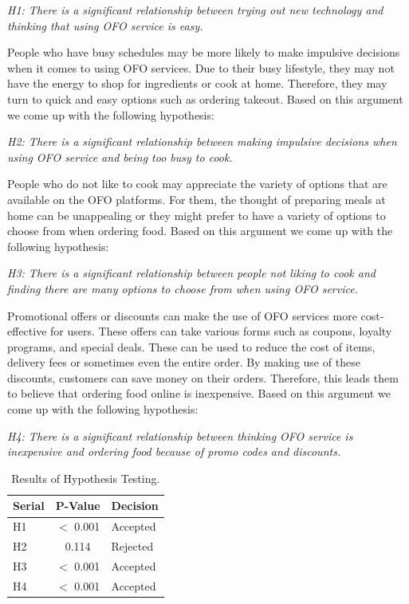 \documentclass[a4paper,fleqn]{cas-sc}
\begin{document}
\textit{H1: There is a significant relationship between trying out new technology and thinking that using OFO service is easy.} 

People who have busy schedules may be more likely to make impulsive decisions when it comes to using OFO services. Due to their busy lifestyle, they may not have the energy to shop for ingredients or cook at home. Therefore, they may turn to quick and easy options such as ordering takeout. Based on this argument we come up with the following hypothesis: 

\textit{H2: There is a significant relationship between making impulsive decisions when using OFO service and being too busy to cook.} 

People who do not like to cook may appreciate the variety of options that are available on the OFO platforms. For them, the thought of preparing meals at home can be unappealing or they might prefer to have a variety of options to choose from when ordering food. Based on this argument we come up with the following hypothesis: 

\textit{H3: There is a significant relationship between people not liking to cook and finding there are many options to choose from when using OFO service.} 

Promotional offers or discounts can make the use of OFO services more cost-effective for users. These offers can take various forms such as coupons, loyalty programs, and special deals. These can be used to reduce the cost of items, delivery fees or sometimes even the entire order. By making use of these discounts, customers can save money on their orders. Therefore, this leads them to believe that ordering food online is inexpensive. Based on this argument we come up with the following hypothesis: 

\textit{H4: There is a significant relationship between thinking OFO service is inexpensive and ordering food because of promo codes and discounts.} 

\begin{table}[htb]
\caption{Results of Hypothesis Testing.}
\begin{tabular*}{\linewidth}{@{\extracolsep{\fill}}lcl@{}}
\toprule
Serial & P-Value & Decision \\
\midrule
H1 & $<$ 0.001 & Accepted \\
H2 & 0.114 & Rejected \\
H3 & $<$ 0.001 & Accepted \\
H4 & $<$ 0.001 & Accepted \\
\bottomrule
\end{tabular*}
\end{table}
\end{document}
